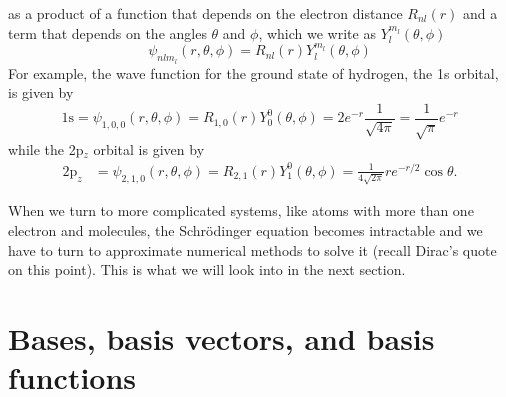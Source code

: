 \documentclass[../Main/chem371-notes.tex]{subfiles}
\begin{document}
 as a product of a function that depends on the electron distance $R_{nl}(r)$ and a term that depends on the angles $\theta$ and $\phi$, which we write as $Y_l^{m_l}(\theta,\phi)$
\begin{equation}
\psi_{nlm_l}(r,\theta,\phi) = R_{nl}(r) Y_l^{m_l}(\theta,\phi)
\end{equation}
For example, the wave function for the  ground state of hydrogen, the 1s orbital, is given by
\begin{equation}
\mathrm{1s} = \psi_{1,0,0}(r,\theta,\phi) = R_{1,0}(r) Y_0^0(\theta,\phi) = 2 e^{-r} \frac{1}{\sqrt{4\pi}} = \frac{1}{\sqrt{\pi}} e^{-r}
\end{equation}
while the 2p$_{z}$ orbital is given by
\begin{align}
\mathrm{2p}_{z} &= \psi_{2,1,0}(r,\theta,\phi) = R_{2,1}(r) Y_1^{0}(\theta,\phi) =
\frac{1}{4\sqrt{2 \pi}}   r e^{-r/2} \cos \theta.
\end{align}

When we turn to more complicated systems, like atoms with more than one electron and molecules, the Schr\"{o}dinger equation becomes intractable and we have to turn to approximate numerical methods to solve it (recall Dirac's quote on this point).
This is what we will look into in the next section.

\section{Bases, basis vectors, and basis functions}

\end{document}
